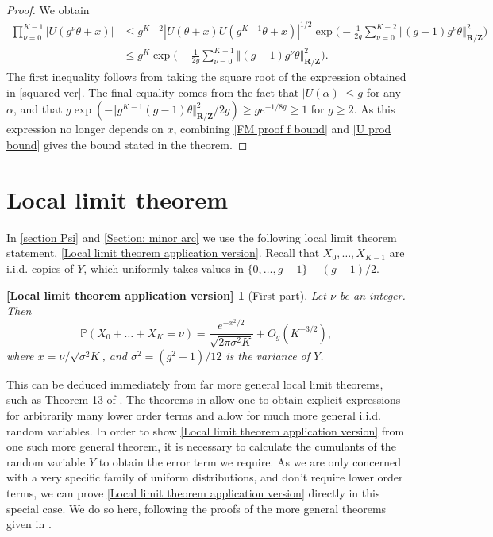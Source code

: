 \documentclass[hidelinks,11pt,reqno]{amsart}
\renewcommand{\leq}{\leqslant}
\renewcommand{\geq}{\geqslant}
\newcommand{\Z}{\ensuremath{\mathbf{Z}}}
\newcommand{\R}{\ensuremath{\mathbf{R}}}
\newcommand{\prob}{\ensuremath{\mathbb{P}}}
\newcommand{\Vertr}{\Vert_{\R/\Z}}
\newcommand{\V}[1]{\Vert #1 \Vertr}
\newtheorem*{llt-rpt}{\cref{Local limit theorem application version}}
\theoremstyle{remark}
\begin{document}
\begin{proof}
    We obtain
    \begin{align}
        \prod_{\nu=0}^{K-1}|U(g^{\nu}\theta+x)|& \leq g^{K-2}|U(\theta+x)U(g^{K-1}\theta+x)|^{1/2}\exp \Big (-\frac{1}{2g}\sum_{\nu=0}^{K-2}\V{ (g-1)g^{\nu}\theta}^{2} \Big ) \nonumber \\
        &\leq g^{K}\exp\Big (-\frac{1}{2g}\sum_{\nu=0}^{K-1}\V{ (g-1) g^{\nu}\theta}^{2}\Big).\label{U prod bound}
    \end{align}  
    The first inequality follows from taking the square root of the expression obtained in \cref{squared ver}. The final equality comes from the fact that $|U(\alpha)|\leq g$ for any $\alpha$, and that $g\exp(-\V{g^{K-1}(g-1)\theta}^{2}/2g)\geq ge^{-1/8g}\geq 1$ for $g\geq 2$. As this expression no longer depends on $x$, combining \cref{FM proof f bound} and \cref{U prod bound} gives the bound stated in the theorem. 
    \end{proof}
\section{Local limit theorem}\label{Section: LLT}
In \cref{section Psi} and \cref{Section: minor arc} we use the following local limit theorem statement, \cref{Local limit theorem application version}. Recall that $X_{0},\ldots, X_{K-1}$ are i.i.d. copies of $Y$, which uniformly takes values in $\{0,\ldots, g-1\}-(g-1)/2$. 
\begin{llt-rpt}[First part]
  Let $\nu$ be an integer. Then 
    \[\prob(X_{0}+\ldots+X_{K}=\nu)=\frac{e^{-x^{2}/2}}{\sqrt{2\pi\sigma^{2}K}}+O_{g}(K^{-3/2}),\]
    where $x=\nu/\sqrt{\sigma^{2}K}$, and $\sigma^{2}=(g^{2}-1)/12$ is the variance of $Y$. 
\end{llt-rpt}
This can be deduced immediately from far more general local limit theorems, such as Theorem 13 of \citep[Ch.~VII]{petrov1972independent}. The theorems in \citep[Ch.~VII]{petrov1972independent} allow one to obtain explicit expressions for arbitrarily many lower order terms and allow for much more general i.i.d. random variables. In order to show \cref{Local limit theorem application version} from one such more general theorem, it is necessary to calculate the cumulants of the random variable $Y$ to obtain the error term we require. As we are only concerned with a very specific family of uniform distributions, and don't require lower order terms, we can prove \cref{Local limit theorem application version} directly in this special case. We do so here, following the proofs of the more general theorems given in \cite{petrov1972independent}. 
\end{document}
